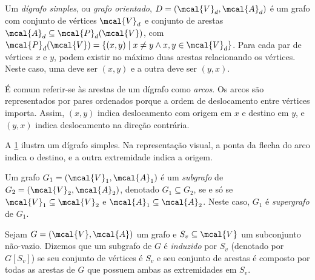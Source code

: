 \begin{mydef}
    Um \emph{dígrafo simples}, ou \emph{grafo orientado}, $D = (\mcal{V}_d, \mcal{A}_d)$ é um grafo com conjunto de vértices $\mcal{V}_d$ e conjunto de arestas $\mcal{A}_d \subseteq \mcal{P}_d(\mcal{V})$, com $\mcal{P}_d(\mcal{V}) = \{(x,y) \mid x \neq y \land x,y \in \mcal{V}_d\}$. Para cada par de vértices $x$ e $y$, podem existir no máximo duas arestas relacionando os vértices. Neste caso, uma deve ser $(x,y)$ e a outra deve ser $(y,x)$.
\end{mydef}

É comum referir-se às arestas de um dígrafo como \emph{arcos}. Os arcos são representados por pares ordenados porque a ordem de deslocamento entre vértices importa. Assim, $(x,y)$ indica deslocamento com origem em $x$ e destino em $y$, e $(y,x)$ indica deslocamento na direção contrária.

A \cref{fig:dígrafo simples} ilustra um dígrafo simples. Na representação visual, a ponta da flecha do arco indica o destino, e a outra extremidade indica a origem.

\begin{figure}[h]
\centering
{}
\caption{}\label{fig:dígrafo simples}
\end{figure}

\begin{mydef}[Subgrafo]
    Um grafo $G_1 = (\mcal{V}_1, \mcal{A}_1)$ é um \emph{subgrafo} de $G_2 = (\mcal{V}_2, \mcal{A}_2)$, denotado $G_1 \subseteq G_2$, se e só se $\mcal{V}_1 \subseteq \mcal{V}_2$ e $\mcal{A}_1 \subseteq \mcal{A}_2$. Neste caso, $G_1$ é \emph{supergrafo} de $G_1$.
\end{mydef}

\begin{mydef}
    Sejam $G = (\mcal{V}, \mcal{A})$ um grafo e $S_v \subseteq \mcal{V}$ um subconjunto não-vazio. Dizemos que um subgrafo de $G$ é \emph{induzido} por $S_v$ (denotado por $G[S_v]$) se seu conjunto de vértices é $S_v$ e seu conjunto de arestas é composto por todas as arestas de $G$ que possuem ambas as extremidades em $S_v$. 
\end{mydef}

